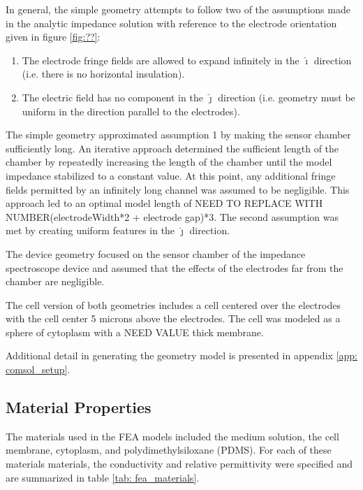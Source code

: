 \par In general, the simple geometry attempts to follow two of the assumptions made in the analytic impedance solution with reference to the electrode orientation given in figure \ref{fig:??}:
\begin{enumerate}
    \item The electrode fringe fields are allowed to expand infinitely in the $\hat{\boldsymbol\imath}$ direction (i.e. there is no horizontal insulation).
    \item The electric field has no component in the $\hat{\boldsymbol\jmath}$ direction (i.e. geometry must be uniform in the direction parallel to the electrodes).
\end{enumerate}

\par The simple geometry approximated assumption 1 by making the sensor chamber sufficiently long. An iterative approach determined the sufficient length of the chamber by repeatedly increasing the length of the chamber until the model impedance stabilized to a constant value. At this point, any additional fringe fields permitted by an infinitely long channel was assumed to be negligible. This approach led to an optimal model length of NEED TO REPLACE WITH NUMBER(electrodeWidth*2 + electrode gap)*3. The second assumption was met by creating uniform features in the $\hat{\boldsymbol\jmath}$ direction.

\par The device geometry focused on the sensor chamber of the impedance spectroscope device and assumed that the effects of the electrodes far from the chamber are negligible. 

\par The cell version of both geometries includes a cell centered over the electrodes with the cell center 5 microns above the electrodes. The cell was modeled as a sphere of cytoplasm with a NEED VALUE thick membrane. 

\par Additional detail in generating the geometry model is presented in appendix \ref{app: comsol_setup}.

\subsection*{Material Properties}
\par The materials used in the FEA models included the medium solution, the cell membrane, cytoplasm, and polydimethylsiloxane (PDMS). For each of these materials materials, the conductivity and relative permittivity were specified and are summarized in table \ref{tab: fea_materials}.


